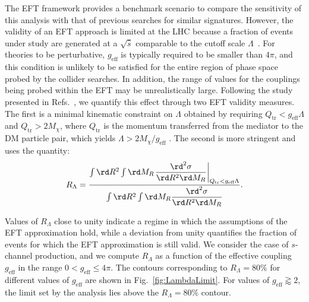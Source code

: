 The EFT framework provides a benchmark scenario to compare
the sensitivity of this analysis with that of previous searches for
similar signatures. However, the
validity of an EFT approach is limited at the LHC because a fraction
of events under study are generated at a $\sqrt{\hat s}$ comparable to
the cutoff scale $\Lambda$~\cite{Goodman:2010ku,TevatronDMFrontier,Friedland:2011za,Buchmueller:2013dya}. For theories to be perturbative, $g_\text{eff}$ is
typically required to be smaller than $4\pi$, and this condition is
unlikely to be satisfied for the entire region of phase space probed by
the collider searches. In addition, the range
of values for the couplings being probed within the EFT may be unrealistically large. Following
the study presented in Refs.~\cite{Riotto1,Riotto2,Riotto3}, we
quantify this effect through two EFT validity measures. The first is a
minimal kinematic constraint on $\Lambda$ obtained by requiring
$Q_\text{tr} < g_\text{eff}\Lambda$ and $Q_\text{tr} >
2M_{\chi}$, where $Q_\text{tr}$ is the momentum transferred
from the mediator to the DM particle pair, which yields $\Lambda > 2M_{\chi}/g_\text{eff}$ . The second is more stringent and uses the quantity:
\begin{equation}
R_\Lambda = \frac{\int \rd\RR^2 \int \rd \MR
  \displaystyle{\left.\frac{\rd^2\sigma}{\rd\RR^2  \rd \MR}\right\vert_{Q_\text{tr}<g_\text{eff}\Lambda} }}
{\int \rd\RR^2 \int \rd \MR \displaystyle{\frac{\rd^2\sigma}{\rd\RR^2  \rd\MR}}}.
\end{equation}

Values of $R_\Lambda$ close to unity indicate a regime in which the
assumptions of the EFT approximation hold, while a deviation from unity quantifies
the fraction of events for which the EFT approximation is still valid. We
consider the case of $s$-channel production, and we compute
$R_\Lambda$ as a function of the effective coupling $g_\text{eff}$
in the range $0 < g_\text{eff} \leq 4\pi$.  The contours
corresponding to $R_\Lambda = 80\%$ for different values of
$g_\text{eff}$ are shown in Fig.~\ref{fig:LambdaLimit}. For values
of $g_\text{eff} \gtrapprox 2$, the limit set by the analysis lies
above the $R_\Lambda = 80\%$ contour.

